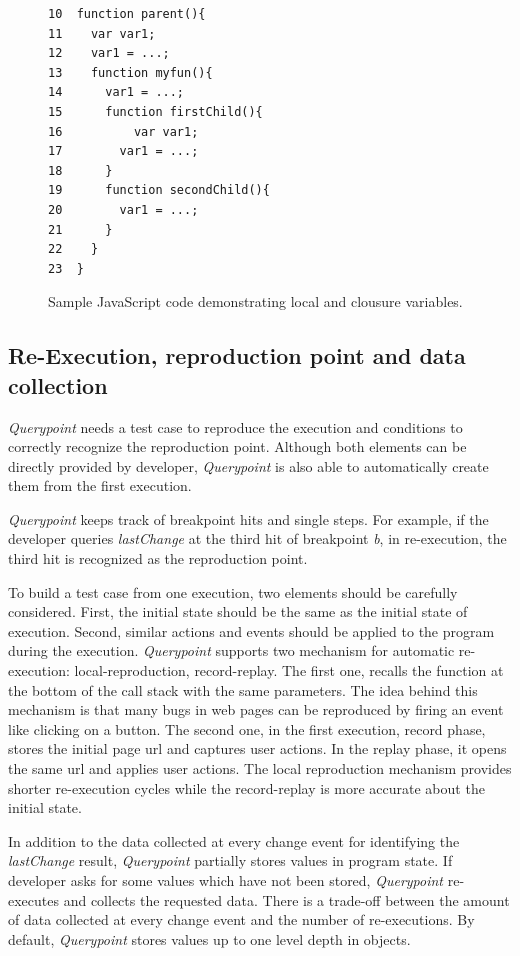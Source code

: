 \documentclass[runningheads,a4paper]{llncs}
\begin{document}
\begin{figure}[htp]
\begin{verbatim}
10  function parent(){
11    var var1;
12    var1 = ...;
13    function myfun(){
14      var1 = ...;
15      function firstChild(){
16       	var var1;
17        var1 = ...;
18      }  
19      function secondChild(){
20        var1 = ...;			      
21      }
22    }  
23  }    
\end{verbatim}
\caption{Sample JavaScript code demonstrating local and clousure variables.}
\label{fig:js-closure}
\end{figure}

\subsection{Re-Execution, reproduction point and data collection}
\textit{Querypoint} needs a test case to reproduce the
execution and conditions to correctly recognize the reproduction point. 
Although both elements can be directly provided by developer, \textit{Querypoint}
is also able to automatically create them from the first execution. 

\textit{Querypoint} keeps track of breakpoint hits and single steps. For example, 
if the developer queries \textit{lastChange} at the third hit of breakpoint \textit{b}, in
re-execution, the third hit is recognized as the reproduction point. 

To build a test case from one execution, two elements should be carefully 
considered. First, the initial state should be the same as the initial state
of execution. Second, similar actions and events should be applied to
the program during the execution. \textit{Querypoint} supports two mechanism
for automatic re-execution: local-reproduction, record-replay. The first one,
recalls the function at the bottom of the call stack with the same parameters. The idea
behind this mechanism is that many bugs in web pages can be reproduced by firing
an event like clicking on a button. The second one, in the first execution, record phase, 
stores the initial page url and captures user actions. In the replay phase, it opens
the same url and applies user actions. The local reproduction mechanism provides
shorter re-execution cycles while the record-replay is more accurate about the
initial state.

In addition to the data collected at every change event for identifying the \textit{lastChange}
result, \textit{Querypoint} partially stores values in program state. If developer asks for 
some values which have not been stored, \textit{Querypoint} re-executes and collects the requested data.
There is a trade-off between the amount of data collected at every change event and the number of re-executions. 
By default, \textit{Querypoint} stores values up to one level depth in objects.
\end{document}
